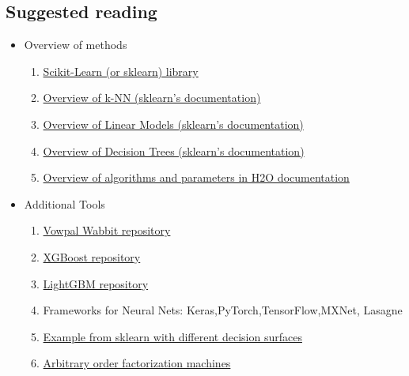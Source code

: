 \documentclass[a4paper]{article}
\begin{document}
\subsection{Suggested reading}
\begin{itemize}
\item Overview of methods\footnotemark
\begin{enumerate}
\item \href{http://scikit-learn.org/stable/}{Scikit-Learn (or sklearn) library}
\item \href{http://scikit-learn.org/stable/modules/neighbors.html}{Overview of k-NN (sklearn's documentation)}
\item \href{http://scikit-learn.org/stable/modules/linear_model.html}{Overview of Linear Models (sklearn's documentation)}
\item \href{http://scikit-learn.org/stable/modules/tree.html}{Overview of Decision Trees (sklearn's documentation)}
\item \href{http://docs.h2o.ai/h2o/latest-stable/h2o-docs/data-science.html}{Overview of algorithms and parameters in H2O documentation}
\end{enumerate}
\item Additional Tools\footnotemark[\value{footnote}]
\begin{enumerate}
\item \href{https://github.com/JohnLangford/vowpal_wabbit}{Vowpal Wabbit repository}
\item \href{https://github.com/dmlc/xgboost}{XGBoost repository}
\item \href{https://github.com/Microsoft/LightGBM}{LightGBM repository}
\item Frameworks for Neural Nets: Keras,PyTorch,TensorFlow,MXNet, Lasagne
\item \href{http://scikit-learn.org/stable/auto_examples/classification/plot_classifier_comparison.html}{Example from sklearn with different decision surfaces}
\item \href{https://github.com/geffy/tffm}{Arbitrary order factorization machines}
\end{enumerate}
\end{itemize}

\end{document}
